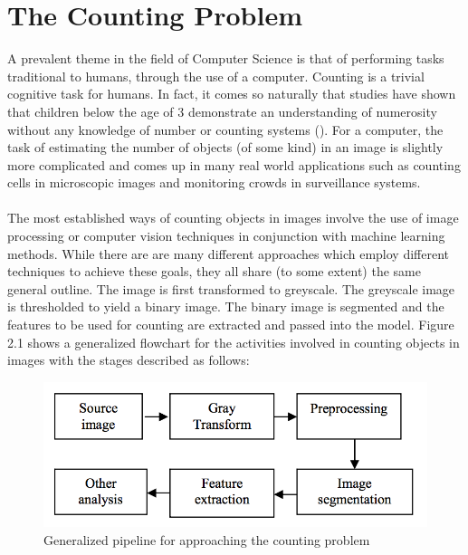 \section{The Counting Problem}
A prevalent theme in the field of Computer Science is that of performing tasks traditional to humans, through the use of a computer. Counting is a trivial cognitive task for humans. In fact, it comes so naturally that studies have shown that children below the age of 3 demonstrate an understanding of numerosity without any knowledge of number or counting systems (\cite{REF1}). For a computer, the task of estimating the number of objects (of some kind) in an image is slightly more complicated and comes up in many real world applications such as counting cells in microscopic images and monitoring crowds in surveillance systems.\\ \\
%
The most established ways of counting objects in images involve the use of image processing or computer vision techniques in conjunction with machine learning methods. While there are are many different approaches which employ different techniques to achieve these goals, they all share (to some extent) the same general outline. The image is first transformed to greyscale. The greyscale image is thresholded to yield a binary image. The binary image is segmented and the features to be used for counting are extracted and passed into the model. Figure 2.1 shows a generalized flowchart for the activities involved in counting objects in images with the stages described as follows:\\
\begin{figure}[ht!]
\centering
\includegraphics[scale=0.5]{Images/general_pipeline}
\caption{Generalized pipeline for approaching the counting problem}
\label{fig:columnfigure}
\end{figure}

